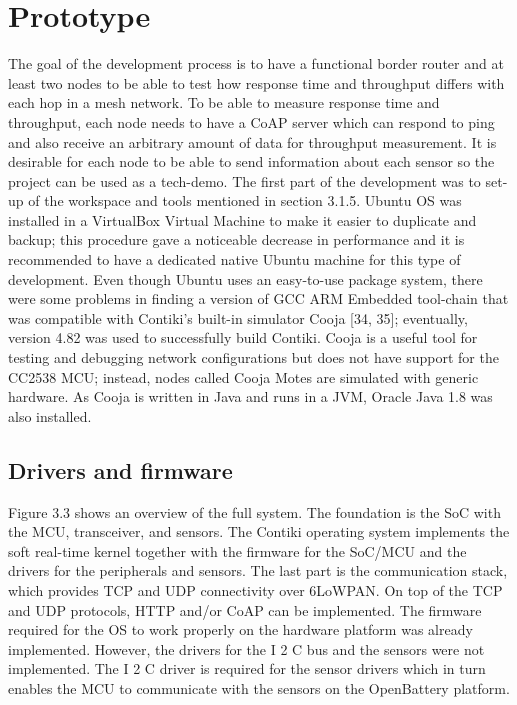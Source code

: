 \section{Prototype}

The goal of the development process is to have a functional border router and at least two nodes to be able to test how response time and throughput differs with each hop in a mesh network.
To be able to measure response time and throughput,
	each node needs to have a CoAP server which can respond to ping and also receive an arbitrary amount of data for throughput measurement.
It is desirable for each node to be able to send information about each sensor so the project can be used as a tech-demo.
The first part of the development was to set-up of the workspace and tools mentioned in section 3.1.5.
Ubuntu OS was installed in a VirtualBox Virtual Machine to make it easier to duplicate and backup;
	this procedure gave a noticeable decrease in performance and it is recommended to have a dedicated native Ubuntu machine for this type of development.
Even though Ubuntu uses an easy-to-use package system,
	there were some problems in finding a version of GCC ARM Embedded tool-chain that was compatible with Contiki’s built-in simulator Cooja [34, 35];
	eventually,
	version 4.82 was used to successfully build Contiki.
Cooja is a useful tool for testing and debugging network configurations but does not have support for the CC2538 MCU;
	instead,
	nodes called Cooja Motes are simulated with generic hardware.
As Cooja is written in Java and runs in a JVM,
	Oracle Java 1.8 was also installed.
	
\subsection{Drivers and firmware}

Figure 3.3 shows an overview of the full system.
The foundation is the SoC with the MCU,
	transceiver,
	and sensors.
The Contiki operating system implements the soft real-time kernel together with the firmware for the SoC/MCU and the drivers for the peripherals and sensors.
The last part is the communication stack,
	which provides TCP and UDP connectivity over 6LoWPAN.
On top of the TCP and UDP protocols,
	HTTP and/or CoAP can be implemented.
The firmware required for the OS to work properly on the hardware platform was already implemented.
However,
	the drivers for the I 2 C bus and the sensors were not implemented.
The I 2 C driver is required for the sensor drivers which in turn enables the MCU to communicate with the sensors on the OpenBattery platform.

